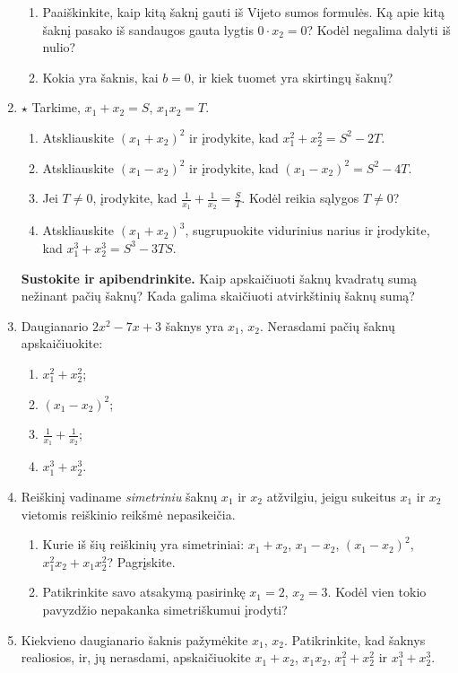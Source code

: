 \documentclass[12pt,a4paper]{article}
\begin{document}
\begin{enumerate}[series=uzdaviniai]
\begin{enumerate}
\item Paaiškinkite, kaip kitą šaknį gauti iš Vijeto sumos formulės. Ką apie kitą šaknį pasako iš sandaugos gauta lygtis $0\cdot x_2=0$? Kodėl negalima dalyti iš nulio?
\item Kokia yra šaknis, kai $b=0$, ir kiek tuomet yra skirtingų šaknų?
\end{enumerate}
\item\label{simetrines-tapatybes} $\star$ Tarkime, $x_1+x_2=S$, $x_1x_2=T$.
\begin{enumerate}
\item Atskliauskite $(x_1+x_2)^2$ ir įrodykite, kad $x_1^2+x_2^2=S^2-2T$.
\item Atskliauskite $(x_1-x_2)^2$ ir įrodykite, kad $(x_1-x_2)^2=S^2-4T$.
\item Jei $T\ne0$, įrodykite, kad $\frac{1}{x_1}+\frac{1}{x_2}=\frac{S}{T}$. Kodėl reikia sąlygos $T\ne0$?
\item Atskliauskite $(x_1+x_2)^3$, sugrupuokite vidurinius narius ir įrodykite, kad $x_1^3+x_2^3=S^3-3TS$.
\end{enumerate}
\textbf{Sustokite ir apibendrinkite.} Kaip apskaičiuoti šaknų kvadratų sumą nežinant pačių šaknų? Kada galima skaičiuoti atvirkštinių šaknų sumą?
\needspace{4cm}
\item Daugianario $2x^2-7x+3$ šaknys yra $x_1$, $x_2$. Nerasdami pačių šaknų apskaičiuokite:
\begin{multicols}{2}\begin{enumerate}
\item $x_1^2+x_2^2$; \item $(x_1-x_2)^2$; \item $\frac{1}{x_1}+\frac{1}{x_2}$; \item $x_1^3+x_2^3$.
\end{enumerate}\end{multicols}
\item Reiškinį vadiname \emph{simetriniu} šaknų $x_1$ ir $x_2$ atžvilgiu, jeigu sukeitus $x_1$ ir $x_2$ vietomis reiškinio reikšmė nepasikeičia.
\begin{enumerate}
\item Kurie iš šių reiškinių yra simetriniai: $x_1+x_2$, $x_1-x_2$, $(x_1-x_2)^2$, $x_1^2x_2+x_1x_2^2$? Pagrįskite.
\item Patikrinkite savo atsakymą pasirinkę $x_1=2$, $x_2=3$. Kodėl vien tokio pavyzdžio nepakanka simetriškumui įrodyti?
\end{enumerate}
\item Kiekvieno daugianario šaknis pažymėkite $x_1$, $x_2$. Patikrinkite, kad šaknys realiosios, ir, jų nerasdami, apskaičiuokite $x_1+x_2$, $x_1x_2$, $x_1^2+x_2^2$ ir $x_1^3+x_2^3$.

\end{enumerate}
\end{document}
